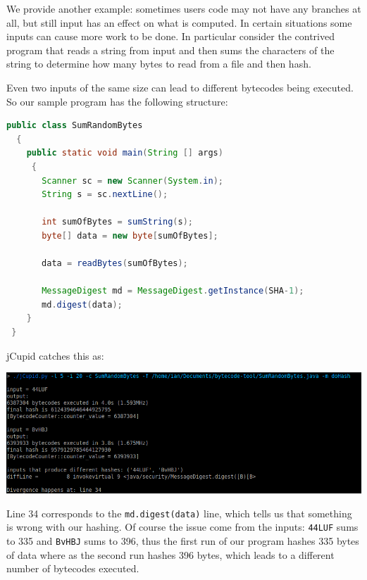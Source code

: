We provide another example: sometimes users code may not have any branches at all, but still input has an effect
on what is computed. In certain situations some inputs can cause more work to be done. In particular consider
the contrived program that reads a string from input and then sums the characters of the string to determine
how many bytes to read from a file and then hash.

Even two inputs of the same size can lead to different bytecodes being executed. So our sample program has
the following structure:

\begin{center}
  \begin{lstlisting}[language=Java]
  public class SumRandomBytes
  {
    public static void main(String [] args)
     {
       Scanner sc = new Scanner(System.in);
       String s = sc.nextLine();
      
       int sumOfBytes = sumString(s);
       byte[] data = new byte[sumOfBytes];
    
       data = readBytes(sumOfBytes);
 
       MessageDigest md = MessageDigest.getInstance(SHA-1);
       md.digest(data);
    }
 }
 \end{lstlisting}
\end{center}

jCupid catches this as:

\begin{center}
  \includegraphics[width=\linewidth]{jCupidSumRandomBytes}
\end{center}

Line 34 corresponds to the \texttt{md.digest(data)} line, which tells us that something is wrong with our
hashing. Of course the issue come from the inputs: \texttt{44LUF} sums to 335 and \texttt{BvHBJ} sums to 
396, thus the first run of our program hashes 335 bytes of data where as the second run hashes 396 bytes,
which leads to a different number of bytecodes executed.
